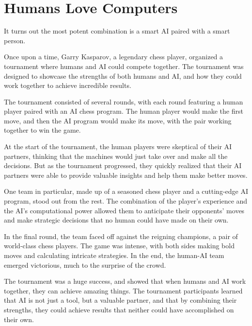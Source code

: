 \section{Humans Love Computers}

It turns out the most potent combination is a smart AI paired with a smart person. 

Once upon a time, Garry Kasparov, a legendary chess player, organized a tournament where humans and AI could compete together. The tournament was designed to showcase the strengths of both humans and AI, and how they could work together to achieve incredible results.

The tournament consisted of several rounds, with each round featuring a human player paired with an AI chess program. The human player would make the first move, and then the AI program would make its move, with the pair working together to win the game.

At the start of the tournament, the human players were skeptical of their AI partners, thinking that the machines would just take over and make all the decisions. But as the tournament progressed, they quickly realized that their AI partners were able to provide valuable insights and help them make better moves.

One team in particular, made up of a seasoned chess player and a cutting-edge AI program, stood out from the rest. The combination of the player's experience and the AI's computational power allowed them to anticipate their opponents' moves and make strategic decisions that no human could have made on their own.

In the final round, the team faced off against the reigning champions, a pair of world-class chess players. The game was intense, with both sides making bold moves and calculating intricate strategies. In the end, the human-AI team emerged victorious, much to the surprise of the crowd.

The tournament was a huge success, and showed that when humans and AI work together, they can achieve amazing things. The tournament participants learned that AI is not just a tool, but a valuable partner, and that by combining their strengths, they could achieve results that neither could have accomplished on their own.

